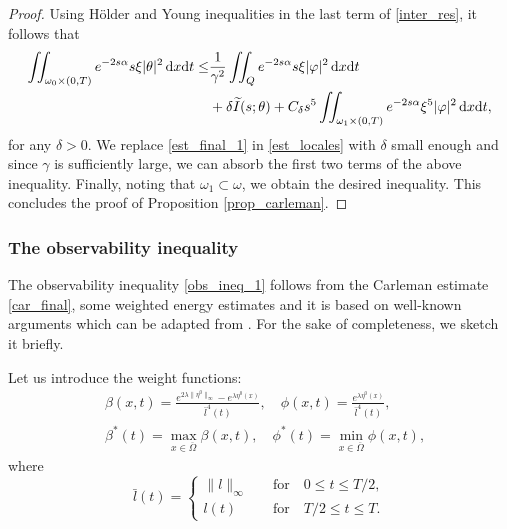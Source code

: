 \documentclass{dcds-bOF}
\theoremstyle{definition}
\def\dx{\,\textnormal{d}x}
\def\dt{\textnormal{d}t}
\begin{document}
\begin{proof}
Using H\"older and Young inequalities in the last term of \eqref{inter_res}, it follows that
%
\begin{equation}\label{est_final_1}
\begin{split}
\iint_{\omega_0\times(0,T)}e^{-2s\alpha}s\xi|\theta|^2\dx\dt\leq& \frac{1}{\gamma^2}\iint_{Q}e^{-2s\alpha}s\xi |\varphi|^2\dx\dt\\
&+\delta \widetilde I(s;\theta)+C_{\delta}s^5\iint_{\omega_1\times(0,T)}e^{-2s\alpha}\xi^5|\varphi|^2\dx\dt,
\end{split}
\end{equation}
%
for any $\delta>0$. We replace \eqref{est_final_1} in \eqref{est_locales} with $\delta$ small enough and  since $\gamma$ is sufficiently large, we can absorb the first two terms of the above inequality. Finally, noting that $\omega_1\subset \omega$, we obtain the desired inequality. This concludes the proof of Proposition \ref{prop_carleman}.
%
\end{proof}

\subsubsection*{The observability inequality}

The observability inequality \eqref{obs_ineq_1} follows from the Carleman estimate \eqref{car_final}, some weighted energy estimates and it is based on well-known arguments which can be adapted from \cite[Lemma 1]{cara_NS}. For the sake of completeness, we sketch it briefly.

Let us introduce the weight functions:
%
\begin{equation}\label{weights_rec}
\begin{split}
&\beta(x,t)= \frac{e^{2\lambda\|\eta^0\|_\infty}-e^{\lambda\eta^0(x)}}{\bar l^4(t)}, \quad \phi(x,t)=\frac{e^{\lambda \eta^0(x)}}{\bar l^4(t)}, \\
&\beta^*(t)=\max_{x\in\overline{\Omega}}\beta(x,t), \quad \phi^*(t)=\min_{x\in\overline\Omega} \phi(x,t),
\end{split}
\end{equation}
%
where
\begin{equation*}
\bar l(t)=
\begin{cases}
\|l\|_\infty &\quad\text{for}\quad 0\leq t\leq T/2, \\
l(t) &\quad\text{for}\quad T/2\leq t\leq T.
\end{cases}
\end{equation*}
\end{document}
